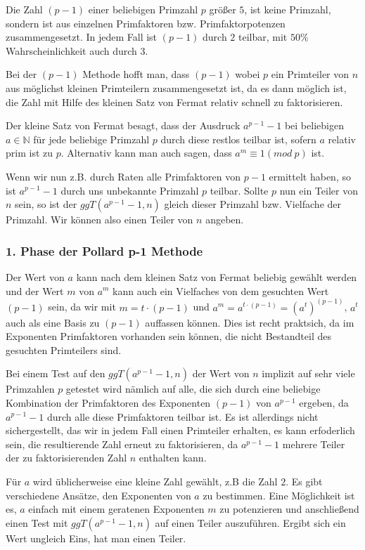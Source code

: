 \documentclass[a4paper,11pt]{article}
\begin{document}
Die Zahl $(p-1)$ einer beliebigen Primzahl $p$ größer $5$, ist keine Primzahl, sondern
ist aus einzelnen Primfaktoren bzw. Primfaktorpotenzen zusammengesetzt.
In jedem Fall ist $(p-1)$ durch $2$ teilbar, mit $50\%$ Wahrscheinlichkeit auch durch $3$.

Bei der $(p-1)$ Methode hofft man, dass $(p-1)$ wobei $p$ ein Primteiler von  $n$
aus möglichst kleinen Primteilern zusammengesetzt ist, da es dann möglich ist, die
Zahl mit Hilfe des kleinen Satz von Fermat relativ schnell zu faktorisieren.

Der kleine Satz von Fermat besagt, dass der Ausdruck $a^{p-1} - 1$ bei beliebigen $a \in {\mathbb N}$
für jede beliebige Primzahl $p$ durch diese restlos teilbar ist, sofern $a$ relativ prim ist zu $p$.
Alternativ kann man auch sagen, dass $a^{m} \equiv 1(mod\ p)$ ist.

Wenn wir nun z.B. durch Raten alle Primfaktoren von $p-1$ ermittelt haben, so ist $a^{p-1} - 1$
durch uns unbekannte Primzahl $p$ teilbar.  Sollte $p$ nun ein Teiler von $n$ sein, so ist der
$ggT(a^{p-1} - 1, n)$ gleich dieser Primzahl bzw. Vielfache der Primzahl. Wir können also
einen Teiler von $n$ angeben.

\subsubsection*{1. Phase der Pollard p-1 Methode}
Der Wert von $a$ kann nach dem kleinen Satz von Fermat beliebig gewählt werden und der Wert
$m$ von $a^m$ kann auch ein Vielfaches von dem gesuchten Wert $(p-1)$ sein, da wir mit
$m = t \cdot (p-1)$ und $a^m = a^{t\cdot(p-1)} = (a^t)^{(p-1)}$, $a^t$ auch als eine Basis
zu $(p-1)$ auffassen können. Dies ist recht praktsich, da im Exponenten Primfaktoren vorhanden
sein können, die nicht Bestandteil des gesuchten Primteilers sind.

Bei einem Test auf den $ggT(a^{p-1} - 1, n)$ der Wert von $n$ implizit auf sehr viele Primzahlen
$p$ getestet wird nämlich auf alle, die sich durch eine beliebige Kombination der Primfaktoren
des Exponenten $(p-1)$ von $a^{p-1}$ ergeben, da $a^{p-1} - 1$ durch alle diese Primfaktoren teilbar
ist. Es ist allerdings nicht sichergestellt, das wir in jedem Fall einen Primteiler erhalten, es kann
erfoderlich sein, die resultierende Zahl erneut zu faktorisieren, da $a^{p-1} - 1$ mehrere Teiler der
zu faktorisierenden Zahl $n$ enthalten kann.

Für $a$ wird üblicherweise eine kleine Zahl gewählt, z.B die Zahl $2$. Es gibt verschiedene Ansätze, den
Exponenten von $a$ zu bestimmen. Eine Möglichkeit ist es, $a$ einfach mit einem geratenen Exponenten
$m$ zu potenzieren und anschließend einen Test mit $ggT(a^{p-1} - 1, n)$ auf einen Teiler auszuführen.
Ergibt sich ein Wert ungleich Eins, hat man einen Teiler.
\end{document}
